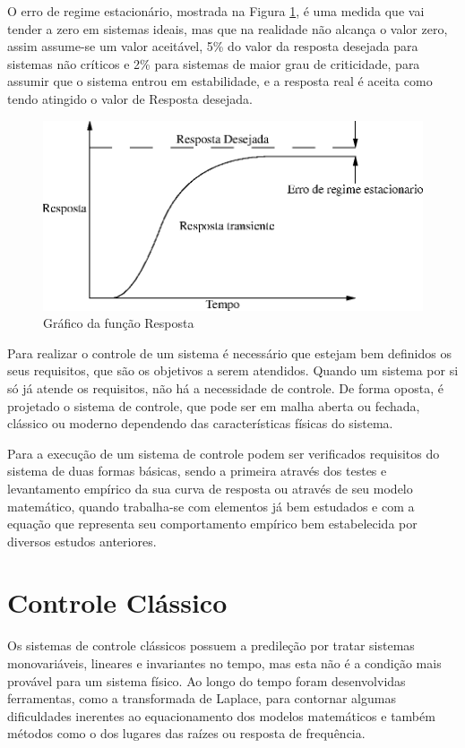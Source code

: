 O erro de regime estacionário, mostrada na Figura \ref{fig:funcaoResposta}, é uma medida que vai tender a zero em sistemas ideais, mas que na realidade não alcança o valor zero, assim assume-se um valor aceitável, 5\% do valor da resposta desejada para sistemas não críticos e 2\% para sistemas de maior grau de criticidade, para assumir que o sistema entrou em estabilidade, e a resposta real é aceita como tendo atingido o valor de Resposta desejada. 

\begin{figure}[!htb]
\center\includegraphics[scale=1]{./pic/C400grafico.eps}
\caption{Gráfico da função Resposta}
\label{fig:funcaoResposta}
\end{figure}

Para realizar o controle de um sistema é necessário que estejam bem definidos os seus requisitos, que são os objetivos a serem atendidos. Quando um sistema por si só já atende os requisitos, não há a necessidade de controle. De forma oposta, é projetado o sistema de controle, que pode ser em malha aberta ou fechada, clássico ou moderno dependendo das características físicas do sistema. 

Para a execução de um sistema de controle podem ser verificados requisitos do sistema de duas formas básicas, sendo a primeira através dos testes e levantamento empírico da sua curva de resposta ou através de seu modelo matemático, quando trabalha-se com elementos já bem estudados e com a equação que representa seu comportamento empírico bem estabelecida por diversos estudos anteriores.

\newpage
\section{Controle Clássico}

Os sistemas de controle clássicos possuem a predileção por tratar sistemas monovariáveis, lineares e invariantes no tempo, mas esta não é a condição mais provável para um sistema físico. Ao longo do tempo foram desenvolvidas ferramentas, como a transformada de Laplace, para contornar algumas dificuldades inerentes ao equacionamento dos modelos matemáticos e também métodos como o dos lugares das raízes ou resposta de frequência.

